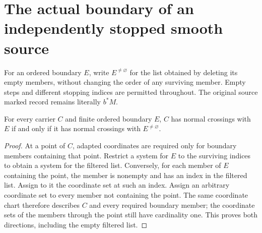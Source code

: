 \section{The actual boundary of an independently stopped smooth source}

For an ordered boundary $E$, write $E^{\ne\varnothing}$ for the list obtained
by deleting its empty members, without changing the order of any surviving
member.  Empty steps and different stopping indices are permitted throughout.
The original source marked record remains literally $b^*M$.

\begin{lemma}
\label{hir:normal-crossings-delete-empty-boundary}
\leanok
For every carrier $C$ and finite ordered boundary $E$, $C$ has normal
crossings with $E$ if and only if it has normal crossings with
$E^{\ne\varnothing}$.
\end{lemma}
\begin{proof}
At a point of $C$, adapted coordinates are required only for boundary
members containing that point.  Restrict a system for $E$ to the
surviving indices to obtain a system for the filtered list.  Conversely,
for each member of $E$ containing the point, the member is nonempty and
has an index in the filtered list.  Assign to it the coordinate set at
such an index.  Assign an arbitrary coordinate set to every member not
containing the point.  The same coordinate chart therefore describes
$C$ and every required boundary member; the coordinate sets of the
members through the point still have cardinality one.  This proves both
directions, including the empty filtered list.
\end{proof}

